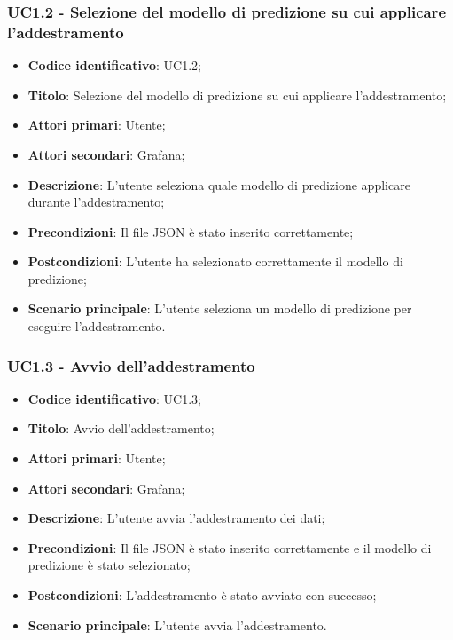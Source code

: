 \subsubsection{UC1.2 - Selezione del modello di predizione su cui applicare l'addestramento}
\begin{itemize}
	\item \textbf{Codice identificativo}: UC1.2;
	\item \textbf{Titolo}: Selezione del modello di predizione su cui applicare l'addestramento;
	\item \textbf{Attori primari}: Utente;
	\item \textbf{Attori secondari}: Grafana\glo;
	\item \textbf{Descrizione}: L'utente seleziona quale modello di predizione applicare durante l'addestramento;
	\item \textbf{Precondizioni}: Il file JSON è stato inserito correttamente;
	\item \textbf{Postcondizioni}: L'utente ha selezionato correttamente il modello di predizione;
	\item \textbf{Scenario principale}: L'utente seleziona un modello di predizione per eseguire l'addestramento.
\end{itemize}

\subsubsection{UC1.3 - Avvio dell'addestramento}
\begin{itemize}
	\item \textbf{Codice identificativo}: UC1.3;
	\item \textbf{Titolo}: Avvio dell'addestramento;
	\item \textbf{Attori primari}: Utente;
	\item \textbf{Attori secondari}: Grafana\glo;
	\item \textbf{Descrizione}: L'utente avvia l'addestramento dei dati;
	\item \textbf{Precondizioni}: Il file JSON è stato inserito correttamente e il modello di predizione è stato selezionato;
	\item \textbf{Postcondizioni}: L'addestramento è stato avviato con successo;
	\item \textbf{Scenario principale}: L'utente avvia l'addestramento.
\end{itemize}

